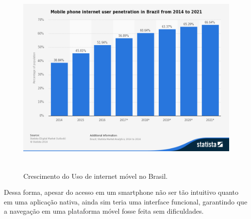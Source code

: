 \begin{figure}[htb]
\centering
\includegraphics[height=10cm]{figuras/mobile_internet}
\caption{\label{fig:mobile_internet} Crescimento do Uso de internet móvel no Brasil.}
\end{figure}
\par Dessa forma, apesar do acesso em um smartphone não ser tão intuitivo quanto em uma aplicação nativa, ainda sim teria uma interface funcional, garantindo que a navegação em uma plataforma móvel fosse feita sem dificuldades.
